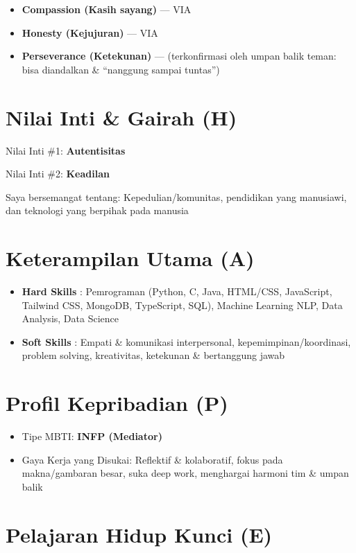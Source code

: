 \documentclass[
  letterpaper,
  DIV=11,
  numbers=noendperiod]{scrreprt}
\begin{document}
\begin{itemize}
\item
  \textbf{Compassion (Kasih sayang)} --- VIA
\item
  \textbf{Honesty (Kejujuran)} --- VIA
\item
  \textbf{Perseverance (Ketekunan)} --- (terkonfirmasi oleh umpan balik
  teman: bisa diandalkan \& ``nanggung sampai tuntas'')
\end{itemize}

\section{Nilai Inti \& Gairah (H)}\label{nilai-inti-gairah-h}

Nilai Inti \#1: \textbf{Autentisitas}

Nilai Inti \#2: \textbf{Keadilan}

Saya bersemangat tentang: Kepedulian/komunitas, pendidikan yang
manusiawi, dan teknologi yang berpihak pada manusia

\section{Keterampilan Utama (A)}\label{keterampilan-utama-a}

\begin{itemize}
\item
  \textbf{Hard Skills} : Pemrograman (Python, C, Java, HTML/CSS,
  JavaScript, Tailwind CSS, MongoDB, TypeScript, SQL), Machine Learning
  NLP, Data Analysis, Data Science
\item
  \textbf{Soft Skills} : Empati \& komunikasi interpersonal,
  kepemimpinan/koordinasi, problem solving, kreativitas, ketekunan \&
  bertanggung jawab
\end{itemize}

\section{Profil Kepribadian (P)}\label{profil-kepribadian-p}

\begin{itemize}
\item
  Tipe MBTI: \textbf{INFP (Mediator)}
\item
  Gaya Kerja yang Disukai: Reflektif \& kolaboratif, fokus pada
  makna/gambaran besar, suka deep work, menghargai harmoni tim \& umpan
  balik
\end{itemize}

\section{Pelajaran Hidup Kunci (E)}\label{pelajaran-hidup-kunci-e}
\end{document}
